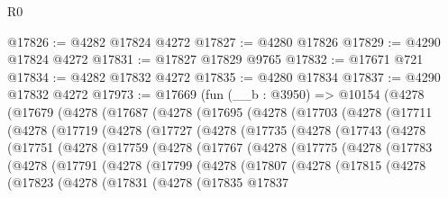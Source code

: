 \begin{lexlean}{R0}
\begin{coremodule}
@17826 := @4282 @17824 @4272
@17827 := @4280 @17826
@17829 := @4290 @17824 @4272
@17831 := @17827 @17829 @9765
@17832 := @17671 @721
@17834 := @4282 @17832 @4272
@17835 := @4280 @17834
@17837 := @4290 @17832 @4272
@17973 := @17669
    (fun (__b : @3950) =>
    @10154
      (@4278
        (@17679
          (@4278
            (@17687
              (@4278
                (@17695
                  (@4278
                    (@17703
                      (@4278
                        (@17711
                          (@4278
                            (@17719
                              (@4278
                                (@17727
                                  (@4278
                                    (@17735
                                      (@4278
                                        (@17743
                                          (@4278
                                            (@17751
                                              (@4278
                                                (@17759
                                                  (@4278
                                                    (@17767
                                                      (@4278
                                                        (@17775
                                                          (@4278
                                                            (@17783
                                                              (@4278
                                                                (@17791
                                                                  (@4278
                                                                    (@17799
                                                                      (@4278
                                                                        (@17807
                                                                          (@4278
                                                                            (@17815
                                                                              (@4278
                                                                                (@17823
                                                                                  (@4278
                                                                                    (@17831
                                                                                      (@4278
                                                                                        (@17835
                                                                                          @17837

\end{coremodule}
\end{lexlean}
